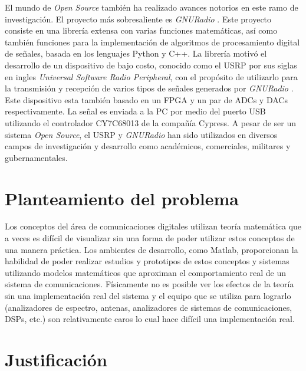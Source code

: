 El mundo de \emph{Open Source} tambi\'en ha realizado avances notorios en este
ramo de investigaci\'on. El proyecto m\'as sobresaliente es
\emph{GNURadio} \cite{radio}. Este proyecto consiste en una librer\'ia extensa
con varias funciones matem\'aticas, as\'i como tambi\'en funciones para la
implementaci\'on de algoritmos de procesamiento digital de se\~nales, basada en los lenguajes Python
y C++. La librer\'ia motiv\'o el desarrollo de un dispositivo de bajo costo, conocido
como el USRP por sus siglas en ingles \emph{Universal Software Radio Peripheral}, con el prop\'osito de
utilizarlo para la transmisi\'on y recepci\'on de varios tipos de se\~nales
generados por \emph{GNURadio} \cite{ettus}. Este dispositivo esta tambi\'en
basado en un FPGA y un par de ADCs y DACs respectivamente. La se\~nal es enviada a la PC por 
medio del puerto USB utilizando el controlador CY7C68013 de la compa\~n\'ia
Cypress. A pesar de ser un sistema \emph{Open Source}, el USRP y \emph{GNURadio}
han sido utilizados en diversos campos de investigaci\'on y desarrollo como
acad\'emicos, comerciales, militares y gubernamentales.

\section{Planteamiento del problema}
Los conceptos del \'area de comunicaciones digitales utilizan 
teor\'ia matem\'atica que a veces es dif\'icil de visualizar sin una 
forma de poder utilizar estos conceptos de una manera pr\'actica.
Los ambientes de desarrollo, 
como Matlab, proporcionan la habilidad de poder realizar estudios y prototipos 
de estos conceptos y sistemas utilizando modelos matem\'aticos que aproximan el 
comportamiento real de un sistema de comunicaciones. F\'isicamente no es
posible ver los efectos de la teor\'ia sin una implementaci\'on real del sistema y
el equipo que se utiliza para lograrlo (analizadores de espectro, antenas, 
analizadores de sistemas de comunicaciones, DSPs, etc.) son relativamente 
caros lo cual hace dif\'icil una implementaci\'on real.
 

\section{Justificaci\'on}

